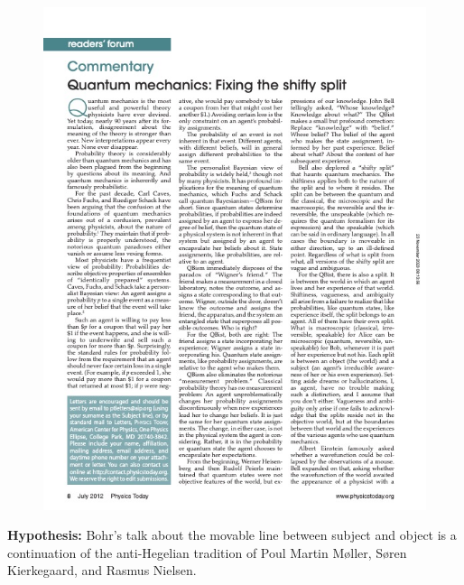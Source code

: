 \documentclass[ignorenonframetext, ]{beamer}
\begin{document}
\begin{frame}

  \begin{figure}
    \centering \includegraphics[scale=0.5]{mermin.jpg}
  \end{figure}

\end{frame}

\begin{frame}

  {\large \textbf{Hypothesis:} Bohr's talk about the movable line
    between subject and object is a continuation of the anti-Hegelian
    tradition of Poul Martin Møller, Søren Kierkegaard, and Rasmus
    Nielsen.}


\end{frame}
\end{document}
